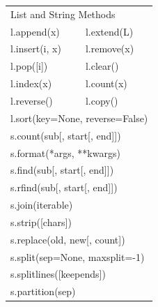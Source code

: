 \documentclass{article}
\begin{document}
\begin{minipage}{0.9\textwidth}
\begin{multicols}{3}
\begin{tabular}{ll}
\multicolumn{2}{l}{\sffamily \color{pythonblue} List and String Methods} \\
l.append(x)    & l.extend(L)                                          \\
l.insert(i, x) & l.remove(x)                                          \\
l.pop([i])     & l.clear()                                            \\
l.index(x)     & l.count(x)                                           \\
l.reverse()    & l.copy()                                             \\
\multicolumn{2}{l}{l.sort(key=None, reverse=False)}                   \\
\multicolumn{2}{l}{s.count(sub[, start[, end]])}                      \\
\multicolumn{2}{l}{s.format(*args, **kwargs)}                         \\
\multicolumn{2}{l}{s.find(sub[, start[, end]])}                       \\
\multicolumn{2}{l}{s.rfind(sub[, start[, end]])}                      \\
\multicolumn{2}{l}{s.join(iterable)}                                  \\
\multicolumn{2}{l}{s.strip([chars])}                                  \\
\multicolumn{2}{l}{s.replace(old, new[, count])}                      \\
\multicolumn{2}{l}{s.split(sep=None, maxsplit=-1)}                    \\
\multicolumn{2}{l}{s.splitlines([keepends])}                          \\
\multicolumn{2}{l}{s.partition(sep)}                                  \\
\end{tabular}


\end{multicols}
\end{minipage}
\end{document}
